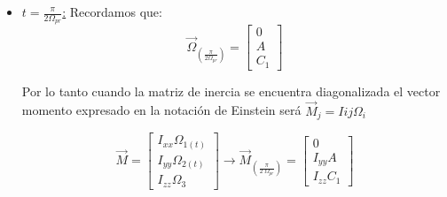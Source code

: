 \documentclass[oneside,a4paper,english,links]{amca}
\begin{document}
\begin{itemize}
    \item \underline{$t=\frac{\pi}{2\Omega_{pr}}$:} Recordamos que:
\begin{equation*}
    \vec{\Omega}_{\left(\frac{\pi}{2\Omega_{pr}}\right)}=
    \begin{bmatrix}
    0\\
    A\\
    C_1
    \end{bmatrix}
\end{equation*}

\noindent Por lo tanto cuando la matriz de inercia se encuentra diagonalizada el vector momento expresado en la notaci\'on de Einstein ser\'a $\vec{M}_j=I{ij}\Omega_i$

\begin{equation}
    \vec{M}=
\begin{bmatrix}
I_{xx} \Omega_{1(t)} \\
I_{yy} \Omega_{2(t)}  \\
I_{zz}  \Omega_3
\end{bmatrix}\xrightarrow[]{}\vec{M}_{\left(\frac{\pi}{2\;\Omega_{pr}}\right)}=
\begin{bmatrix}
0\\
I_{yy} A \\
I_{zz}    C_1
\end{bmatrix}
\label{eq:cinemat_momento_vectorial_t=pi/2omegapr}
\end{equation}

\end{itemize}
\end{document}
